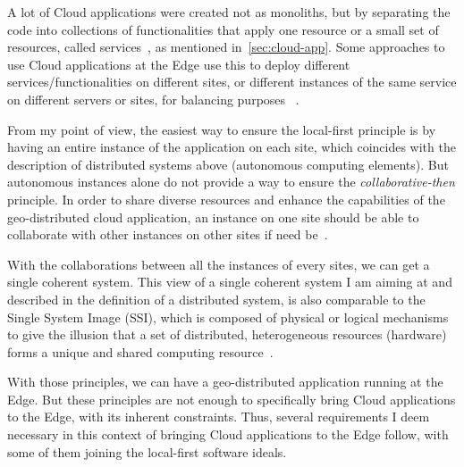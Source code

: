 %
A lot of Cloud applications were created not as monoliths, but by
separating the code into collections of functionalities that apply one
resource or a small set of resources, called services~\cite{JPM+18,
Fie00}, as mentioned in~\autoref{sec:cloud-app}.
%
Some approaches to use Cloud applications at the Edge use this to
deploy different services/functionalities on different sites, or
different instances of the same service on different \glspl{server} or
sites, for balancing purposes~\cite{WVMN17,ROCW14,FLR16} .

From my point of view, the easiest way to ensure the local-first
principle is by having an entire instance of the application on each
site, which coincides with the description of distributed systems
above (autonomous computing elements).
%
%
But autonomous instances alone do not provide a way to ensure the
\emph{collaborative-then} principle.
%
In order to share diverse resources and enhance the capabilities of
the geo-distributed cloud application, an instance on one site should
be able to collaborate with other instances on other sites if need
be~\cite{BJ13}.

With the collaborations between all the instances of every sites, we
can get a single coherent system.
%
This view of a single coherent system I am aiming at and described in
the definition of a distributed system, is also comparable to the
Single System Image (SSI), which is composed of physical or logical
mechanisms to give the illusion that a set of distributed,
heterogeneous resources (hardware) forms a unique and shared computing
resource~\cite{BCJ01}.

With those principles, we can have a geo-distributed application
running at the Edge.
%
But these principles are not enough to specifically bring Cloud
applications to the Edge, with its inherent constraints.
%
Thus, several requirements I deem necessary in this context of
bringing Cloud applications to the Edge follow, with some of them
joining the local-first software ideals.


